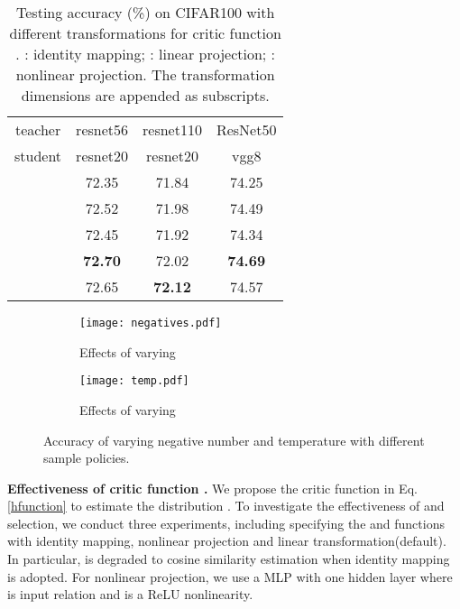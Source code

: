 \documentclass[final]{cvpr}
\begin{document}
\begin{table}[t]
\small
    \centering
\caption{Testing accuracy (\%) on CIFAR100 with different transformations for critic function . : identity mapping; : linear projection; : nonlinear  projection. 
The transformation dimensions are appended as subscripts.}
\begin{tabular}{c|cc|c}
\toprule
teacher & resnet56 &resnet110 &  ResNet50 \\
student   &  resnet20 & resnet20 & vgg8\\
\midrule
 & 72.35  & 71.84 & 74.25 \\

 & 72.52 & 71.98 & 74.49 \\
\midrule
 &72.45 & 71.92 & 74.34 \\
 & \textbf{72.70} & 72.02 & \textbf{74.69}\\
 & 72.65 & \textbf{72.12} & 74.57 \\
\bottomrule
\end{tabular}
    
    \label{tab:critic}
\end{table}
\begin{figure}[t]
     \centering
     \begin{subfigure}[b]{0.23\textwidth}
         \centering
         \texttt{[image: negatives.pdf]}
         \caption{Effects of varying }
         \label{fig: negative number}
     \end{subfigure}
     \hfill
      \hspace{.000001in}
     \begin{subfigure}[b]{0.23\textwidth}
         \centering
         \texttt{[image: temp.pdf]}
         \caption{Effects of varying }
         \label{fig:temperature}
     \end{subfigure}
        \caption{Accuracy of varying negative number  and temperature  with different sample policies.}
        \label{fig:queue}
\end{figure}


\noindent \textbf{Effectiveness of critic function .}
We propose the critic function  in Eq. \ref{hfunction} to estimate the distribution .
To investigate the effectiveness of  and  selection, we conduct three experiments, including specifying the  and  functions with identity mapping, nonlinear projection and linear transformation(default).
 In particular,  is degraded to cosine similarity estimation when identity mapping is adopted. For nonlinear projection, we use a MLP with one hidden layer  where  is input relation and  is a ReLU nonlinearity.
\end{document}
